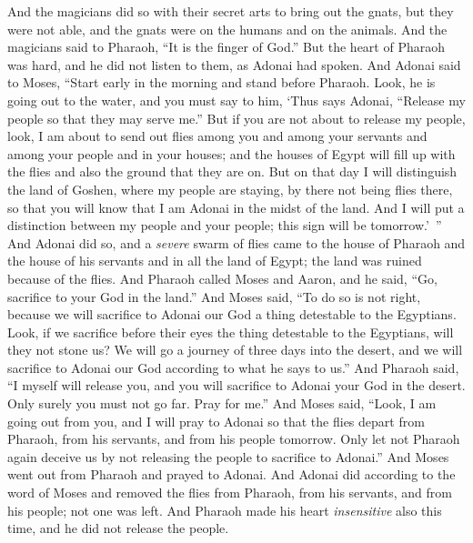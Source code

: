 \begin{biblechapter}
\verse And the magicians did so with their secret arts to bring out the gnats, but they were not able, and the gnats were on the humans and on the animals.
\verse And the magicians said to Pharaoh, “It is the finger of God.” But the heart of Pharaoh was hard, and he did not listen to them, as Adonai had spoken.
 And Adonai said to Moses, “Start early in the morning and stand before Pharaoh. Look, he is going out to the water, and you must say to him, ‘Thus says Adonai, “Release my people so that they may serve me.”
\verse But if you are not about to release my people, look, I am about to send out flies among you and among your servants and among your people and in your houses; and the houses of Egypt will fill up with the flies and also the ground that they are on.
\verse But on that day I will distinguish the land of Goshen, where my people are staying, by there not being flies there, so that you will know that I am Adonai in the midst of the land.
\verse And I will put a distinction between my people and your people; this sign will be tomorrow.’ ”
\verse And Adonai did so, and a \textit{severe} swarm of flies came to the house of Pharaoh and the house of his servants and in all the land of Egypt; the land was ruined because of the flies.
\verse And Pharaoh called Moses and Aaron, and he said, “Go, sacrifice to your God in the land.”
\verse And Moses said, “To do so is not right, because we will sacrifice to Adonai our God a thing detestable to the Egyptians. Look, if we sacrifice before their eyes the thing detestable to the Egyptians, will they not stone us?
\verse We will go a journey of three days into the desert, and we will sacrifice to Adonai our God according to what he says to us.”
\verse And Pharaoh said, “I myself will release you, and you will sacrifice to Adonai your God in the desert. Only surely you must not go far. Pray for me.”
\verse And Moses said, “Look, I am going out from you, and I will pray to Adonai so that the flies depart from Pharaoh, from his servants, and from his people tomorrow. Only let not Pharaoh again deceive us by not releasing the people to sacrifice to Adonai.”
\verse And Moses went out from Pharaoh and prayed to Adonai.
\verse And Adonai did according to the word of Moses and removed the flies from Pharaoh, from his servants, and from his people; not one was left.
\verse And Pharaoh made his heart \textit{insensitive} also this time, and he did not release the people.
\end{biblechapter}

